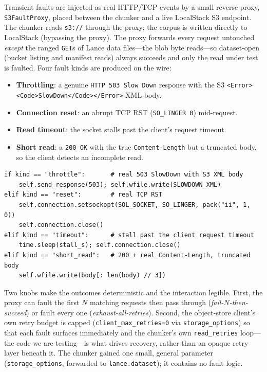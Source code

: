 \documentclass[11pt]{article}
\newcommand{\ct}[1]{\texttt{\small #1}}
\begin{document}
Transient faults are injected as real HTTP/TCP events by a small reverse proxy,
\ct{S3FaultProxy}, placed between the chunker and a live LocalStack S3 endpoint.
The chunker reads \ct{s3://} through the proxy; the corpus is written directly to
LocalStack (bypassing the proxy). The proxy forwards every request untouched
\emph{except} the ranged \ct{GET}s of Lance data files---the blob byte
reads---so dataset-open (bucket listing and manifest reads) always succeeds and
only the read under test is faulted. Four fault kinds are produced on the wire:

\begin{itemize}[itemsep=1pt,topsep=2pt]
  \item \textbf{Throttling}: a genuine \ct{HTTP 503 Slow Down} response with the
  S3 \ct{<Error><Code>SlowDown</Code></Error>} XML body.
  \item \textbf{Connection reset}: an abrupt TCP RST (\ct{SO\_LINGER 0}) mid-request.
  \item \textbf{Read timeout}: the socket stalls past the client's request timeout.
  \item \textbf{Short read}: a \ct{200 OK} with the true \ct{Content-Length} but a
  truncated body, so the client detects an incomplete read.
\end{itemize}

\begin{lstlisting}[style=py]
if kind == "throttle":       # real 503 SlowDown with S3 XML body
    self.send_response(503); self.wfile.write(SLOWDOWN_XML)
elif kind == "reset":        # real TCP RST
    self.connection.setsockopt(SOL_SOCKET, SO_LINGER, pack("ii", 1, 0))
    self.connection.close()
elif kind == "timeout":      # stall past the client request timeout
    time.sleep(stall_s); self.connection.close()
elif kind == "short_read":   # 200 + real Content-Length, truncated body
    self.wfile.write(body[: len(body) // 3])
\end{lstlisting}

Two knobs make the outcomes deterministic and the interaction legible. First, the
proxy can fault the first $N$ matching requests then pass through
(\emph{fail-$N$-then-succeed}) or fault every one (\emph{exhaust-all-retries}).
Second, the object-store client's own retry budget is capped
(\ct{client\_max\_retries=0} via \ct{storage\_options}) so that each fault
surfaces immediately and the chunker's own \ct{read\_retries} loop---the code we
are testing---is what drives recovery, rather than an opaque retry layer beneath
it. The chunker gained one small, general parameter (\ct{storage\_options},
forwarded to \ct{lance.dataset}); it contains no fault logic.
\end{document}
